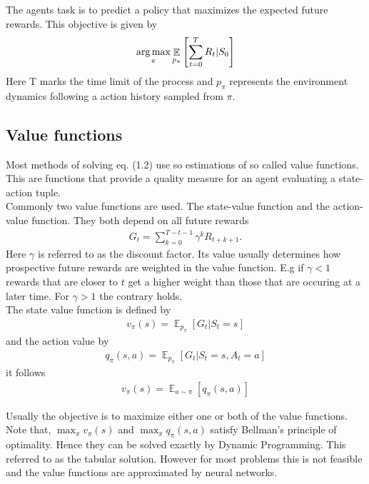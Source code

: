 The agents task is to predict a policy that maximizes the expected future rewards. This objective is given by
\begin{align}
	\operatorname*{arg\,max}_{\pi}\mathop{\mathbb{E}}_{p_{\pi}}\left[\sum_{t=0}^T R_t | S_0\right]
\end{align}
Here T marks the time limit of the process and $p_{\pi}$ represents the environment dynamics following a action history sampled from $\pi$.\\

\subsection{Value functions}
Most methods of solving eq. (1.2) use so estimations of so called value functions. This are functions that provide a quality measure for an agent evaluating a state-action tuple. \\
Commonly two value functions are used. The state-value function and the action-value function. They both depend on all future rewards
\begin{align}
	G_t = \sum^{T-t-1}_{k=0} \gamma^kR_{t+k+1} .
\end{align}
Here $\gamma$ is referred to as the discount factor. Its value usually determines how prospective future rewards are weighted in the value function. E.g if $\gamma<1$ rewards that are closer to $t$ get a higher weight than those that are occuring at a later time. For $\gamma>1$ the contrary holds.\\
The state value function is defined by
\begin{align}
	v_{\pi}(s) = \mathop{\mathbb{E}}_{p_{\pi}}\left[G_t|S_t=s \right]
\end{align}
and the action value by
\begin{align}
	q_{\pi}(s, a) = \mathop{\mathbb{E}}_{p_{\pi}}\left[G_t|S_t=s, A_t=a \right]
\end{align}
it follows
\begin{align}
	v_{\pi}(s) = \mathop{\mathbb{E}}_{a\sim\pi}\left[ q_{\pi}(s, a)\right]
\end{align}

\noindent Usually the objective is to maximize either one or both of the value functions.
Note that, $\max_{\pi}v_{\pi}(s)$ and $\max_{\pi}q_{\pi}(s, a)$ satisfy Bellman's principle of optimality. Hence they can be solved exactly by Dynamic Programming. This referred to as the tabular solution. However for most problems this is not feasible and the value functions are approximated by neural networks. \\

